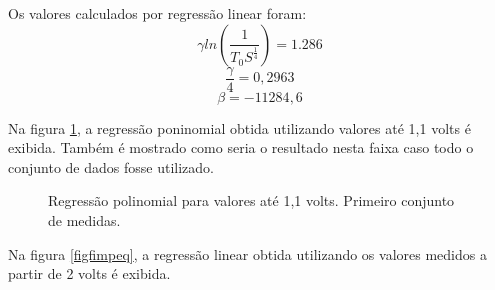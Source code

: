 \documentclass[brazilian,12pt,a4paper,final]{article}
\begin{document}
Os valores calculados por regressão linear foram:
$$\gamma ln(\frac{1}{T_0S^\frac{1}{4}}) = 1.286$$
$$\frac{\gamma}{4}=0,2963$$
$$\beta = -11284,6$$

Na figura \ref{figiniciopeq}, a regressão poninomial obtida utilizando 
valores até 1,1 volts é exibida.
Também é 
mostrado como seria o resultado nesta faixa caso todo o conjunto de dados fosse utilizado.

\begin{figure}[htbp!]
  \caption{Regressão polinomial para valores até 1,1 volts. Primeiro conjunto de medidas.}
  \label{figiniciopeq}
  \centering
\end{figure}

Na figura \ref{figfimpeq}, a regressão linear obtida utilizando 
os valores medidos a partir de 2 volts é exibida.
\end{document}
